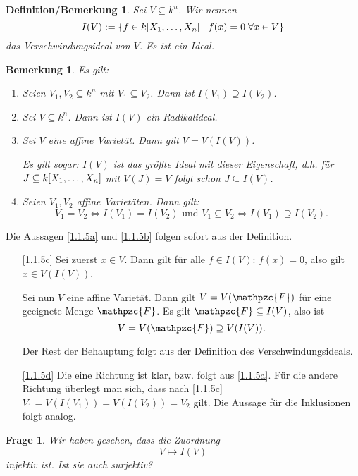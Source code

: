 \documentclass[a4paper,12pt]{scrbook}
\makeatletter
\theoremstyle{blah}
\newtheorem*{q}{Frage}
\newtheorem{bem}[dfn]{Bemerkung}
\newtheorem{db}[dfn]{Definition/Bemerkung}
\theoremstyle{stz}
\renewcommand{\proofname}{Beweis}
\renewenvironment{proof}[1][\proofname]{\par
  \pushQED{\qed}%
  \normalfont \topsep6\p@\@plus6\p@\relax
  \trivlist
  \item[\hskip\labelsep
        \itshape
    #1\@addpunct{:}]\ignorespaces
}{%
  \popQED\endtrivlist\@endpefalse
}
\newcommand{\F}{\mathpzc{F}}
\renewcommand{\mapsto}{\longmapsto}
\newcommand{\polyx}{\ensuremath%
  [X_{1},\dotsc,X_{n}]}
\makeatother
\begin{document}
\begin{db}
Sei $V\subseteq k^{n}$. Wir nennen
\[I(V):=\{f\in k\polyx\mid f(x)=0\;\forall x\in V\}\]
das \emph{Verschwindungsideal von $V$}. Es ist ein Ideal.
\end{db}

\begin{bem} Es gilt:
\begin{enumerate}
\item\label{1.1.5a} Seien $V_{1},V_{2}\subseteq k^{n}$ mit $V_{1}\subseteq V_{2}$. Dann ist $I(V_{1})\supseteq I(V_{2})$.
\item\label{1.1.5b} Sei $V\subseteq k^{n}$. Dann ist $I(V)$ ein Radikalideal.
\item\label{1.1.5c} Sei $V$ eine affine Varietät. Dann gilt $V=V(I(V))$.

Es gilt sogar: $I(V)$ ist das größte Ideal mit dieser Eigenschaft, d.h. für $J\subseteq k\polyx$ mit $V(J)=V$ folgt schon $J\subseteq I(V)$.
\item\label{1.1.5d} Seien $V_{1},V_{2}$ affine Varietäten. Dann gilt:
\[V_{1}=V_{2}\iff I(V_{1})=I(V_{2})\text{ und } V_{1}\subseteq V_{2}\iff I(V_{1})\supseteq I(V_{2}).\]
\end{enumerate}
\end{bem}

\begin{proof} Die Aussagen \ref{1.1.5a} und \ref{1.1.5b} folgen sofort aus der Definition.
\begin{enumerate}
\item[\ref{1.1.5c}] Sei zuerst $x\in V$. Dann gilt für alle $f\in I(V)$: $f(x)=0$, also gilt $x\in V(I(V))$.

Sei nun $V$ eine affine Varietät. Dann gilt $V=V(\F)$ für eine geeignete Menge $\F$. Es gilt $\F\subseteq I(V)$, also ist
\[V=V(\F)\supseteq V(I(V)).\]

Der Rest der Behauptung folgt aus der Definition des Verschwindungsideals.
\item[\ref{1.1.5d}] Die eine Richtung ist klar, bzw. folgt aus \ref{1.1.5a}. Für die andere Richtung überlegt man sich, dass nach \ref{1.1.5c} $V_{1}=V(I(V_{1}))=V(I(V_{2}))=V_{2}$ gilt.  Die Aussage für die Inklusionen folgt analog.\qedhere
\end{enumerate}
\end{proof}

\begin{q}
Wir haben gesehen, dass die Zuordnung
\[V\mapsto I(V)\]
injektiv ist. Ist sie auch surjektiv?
\end{q}
\end{document}
